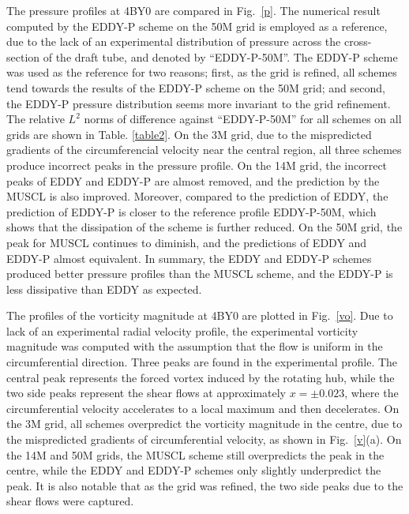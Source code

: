 The pressure profiles at 4BY0 are compared in Fig.~\ref{p}. The numerical result computed by the EDDY-P scheme on the 50M grid is employed as a reference, due to the lack of an experimental distribution of pressure across the cross-section of the draft tube, and denoted by ``EDDY-P-50M''. The EDDY-P scheme was used as the reference for two reasons; first, as the grid is refined, all schemes tend towards the results of the EDDY-P scheme on the 50M grid; and second, the EDDY-P pressure distribution seems more invariant to the grid refinement. The relative $L^{2}$ norms of difference against ``EDDY-P-50M'' for all schemes on all grids are shown in Table. \ref{table2}. On the 3M grid, due to the mispredicted gradients of the circumferencial velocity near the central region, all three schemes produce incorrect peaks in the pressure profile. On the 14M grid, the incorrect peaks of EDDY and EDDY-P are almost removed, and the prediction by the MUSCL is also improved. Moreover, compared to the prediction of EDDY, the prediction of EDDY-P is closer to the reference profile EDDY-P-50M, which shows that the dissipation of the scheme is further reduced. On the 50M grid, the peak for MUSCL continues to diminish, and the predictions of EDDY and EDDY-P almost equivalent. In summary, the EDDY and EDDY-P schemes produced better pressure profiles than the MUSCL scheme, and the EDDY-P is less dissipative than EDDY as expected. 

The profiles of the vorticity magnitude at 4BY0 are plotted in Fig.~\ref{vo}. Due to lack of an experimental radial velocity profile, the experimental vorticity magnitude was computed with the assumption that the flow is uniform in the circumferential direction. Three peaks are found in the experimental profile. The central peak represents the forced vortex induced by the rotating hub, while the two side peaks represent the shear flows at approximately $x=\pm 0.023$, where the circumferential velocity accelerates to a local maximum and then decelerates. On the 3M grid, all schemes overpredict the vorticity magnitude in the centre, due to the mispredicted gradients of circumferential velocity, as shown in Fig.~\ref{v}(a). On the 14M and 50M grids, the MUSCL scheme still overpredicts the peak in the centre, while the EDDY and EDDY-P schemes only slightly underpredict the peak. It is also notable that as the grid was refined, the two side peaks due to the shear flows were captured.

